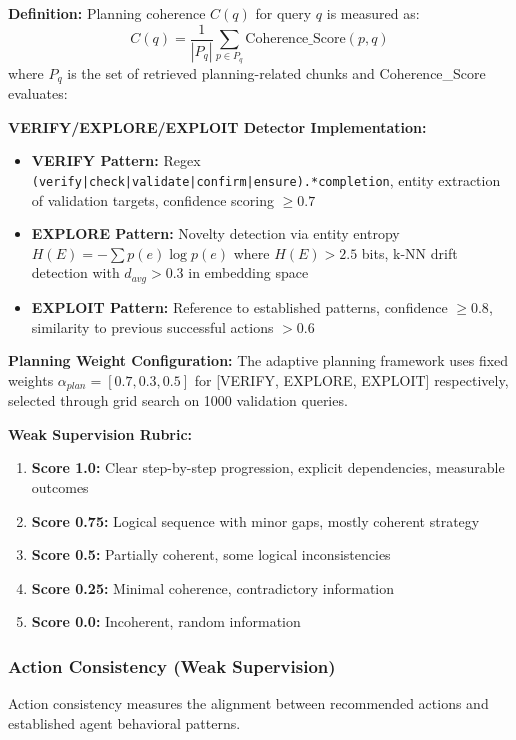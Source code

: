 \textbf{Definition:} Planning coherence $C(q)$ for query $q$ is measured as:
\begin{equation}
C(q) = \frac{1}{|P_q|} \sum_{p \in P_q} \text{Coherence\_Score}(p, q)
\end{equation}
where $P_q$ is the set of retrieved planning-related chunks and Coherence\_Score evaluates:

\textbf{VERIFY/EXPLORE/EXPLOIT Detector Implementation:}
\begin{itemize}
    \item \textbf{VERIFY Pattern:} Regex \texttt{(verify|check|validate|confirm|ensure).*completion}, entity extraction of validation targets, confidence scoring $\geq 0.7$
    \item \textbf{EXPLORE Pattern:} Novelty detection via entity entropy $H(E) = -\sum p(e) \log p(e)$ where $H(E) > 2.5$ bits, k-NN drift detection with $d_{avg} > 0.3$ in embedding space
    \item \textbf{EXPLOIT Pattern:} Reference to established patterns, confidence $\geq 0.8$, similarity to previous successful actions $> 0.6$
\end{itemize}

\textbf{Planning Weight Configuration:}
The adaptive planning framework uses fixed weights $\alpha_{plan} = [0.7, 0.3, 0.5]$ for [VERIFY, EXPLORE, EXPLOIT] respectively, selected through grid search on 1000 validation queries.

\textbf{Weak Supervision Rubric:}
\begin{enumerate}
    \item \textbf{Score 1.0:} Clear step-by-step progression, explicit dependencies, measurable outcomes
    \item \textbf{Score 0.75:} Logical sequence with minor gaps, mostly coherent strategy
    \item \textbf{Score 0.5:} Partially coherent, some logical inconsistencies
    \item \textbf{Score 0.25:} Minimal coherence, contradictory information
    \item \textbf{Score 0.0:} Incoherent, random information
\end{enumerate}

\subsubsection{Action Consistency (Weak Supervision)}
Action consistency measures the alignment between recommended actions and established agent behavioral patterns.

